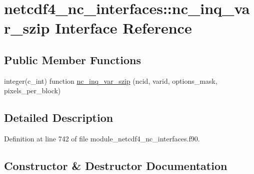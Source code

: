 \hypertarget{interfacenetcdf4__nc__interfaces_1_1nc__inq__var__szip}{}\section{netcdf4\+\_\+nc\+\_\+interfaces\+:\+:nc\+\_\+inq\+\_\+var\+\_\+szip Interface Reference}
\label{interfacenetcdf4__nc__interfaces_1_1nc__inq__var__szip}
\subsection*{Public Member Functions}
\begin{DoxyCompactItemize}
\item 
integer(c\+\_\+int) function \hyperlink{interfacenetcdf4__nc__interfaces_1_1nc__inq__var__szip_a5aa664511ab78bdf2a3597a0176d4fa6}{nc\+\_\+inq\+\_\+var\+\_\+szip} (ncid, varid, options\+\_\+mask, pixels\+\_\+per\+\_\+block)
\end{DoxyCompactItemize}


\subsection{Detailed Description}


Definition at line 742 of file module\+\_\+netcdf4\+\_\+nc\+\_\+interfaces.\+f90.



\subsection{Constructor \& Destructor Documentation}
\mbox{\label{interfacenetcdf4__nc__interfaces_1_1nc__inq__var__szip_a5aa664511ab78bdf2a3597a0176d4fa6}} 
